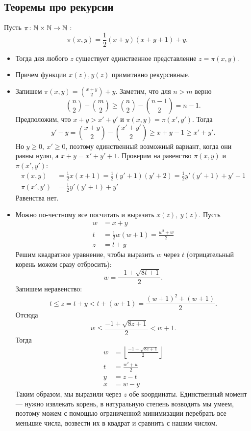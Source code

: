 \subsection{Теоремы про рекурсии}
\begin{thm}
    Пусть $ \pi\colon \mathbb{N} \times \mathbb{N} \to  \mathbb{N}$ :
	\[
		\pi(x, y) = \frac{1}{2}(x+y) (x+y+1)+y
	.\] 
	\begin{itemize}
	\item
	Тогда для любого $ z$ существует единственное представление $ z = \pi(x, y)$.
\item Причем функции $ x(z), y(z)$ примитивно рекурсивные.
	\end{itemize}
\end{thm}
\begin{proof*}
	\begin{itemize}
		\item
	Запишем $ \pi(x, y) = {{x+y}\choose{2}} + y$. Заметим, что для $ n > m$ верно  
	$$ {n \choose 2} - {m \choose 2} \ge {n \choose 2} - {n-1 \choose 2} = n-1.$$
	Предположим, что $ x + y > x' + y'$ и  $ \pi(x, y) = \pi(x',y')$. Тогда
	 \[
		 y' - y = {x+y \choose 2} - {x'+y' \choose 2} \ge x + y - 1 \ge x' + y'
	.\] 
	Но $ y \ge 0, ~ x' \ge 0$,  поэтому единственный возможный вариант, когда они равны нулю, а $ x+y = x'+y'+1$. Проверим на равенство  $ \pi(x, y)$ и $ \pi(x', y')$:
	\[
	\begin{aligned}
		\pi(x, y) & = \frac{1}{2}x(x+1) = \frac{1}{2}(y'+1)(y'+2) = \frac{1}{2}y'(y'+1) + y' + 1 \\
		\pi(x', y') &= \frac{1}{2}y'(y'+1) + y'
	\end{aligned}
	\]
	Равенства нет.
\item  Можно по-честному все посчитать и выразить $ x(z), ~y(z)$.
	Пусть 
	\[
	\begin{aligned}
		w &= x+y \\
		t &= \frac{1}{2}w(w+1) = \frac{w^2+w}{2} \\
		z &= t +y
	\end{aligned}
	\]
	Решим квадратное уравнение, чтобы выразить $ w$ через $ t$ (отрицательный корень можем сразу отбросить):
	\[
		w = \frac{-1 + \sqrt{ 8t + 1}}{2}
	.\] 
	Запишем неравенство:
	\[
		t \le z = t + y < t + (w +1) = \frac{(w+1)^2+(w+1)}{2}
	.\] 
	Отсюда
	\[
		w \le \frac{-1  + \sqrt{ 8z +1} }{2} < w+1
	.\] 
	Тогда 
	\[
	\begin{aligned}
		w &= \left\lfloor \frac{-1 + \sqrt{ 8z+1} }{2} \right\rfloor \\
		t &= \frac{w^2+w}{2} \\
		y &= z - t \\
		x &= w - y
	\end{aligned}
	\]
	Таким образом, мы выразили через $ z$ обе координаты. Единственный момент --- нужно извлекать корень, в натуральную степень возводить мы умеем, поэтому можем с помощью ограниченной минимизации перебрать все меньшие числа, возвести их в квадрат и сравнить с нашим числом.
	\end{itemize}
\end{proof*}


